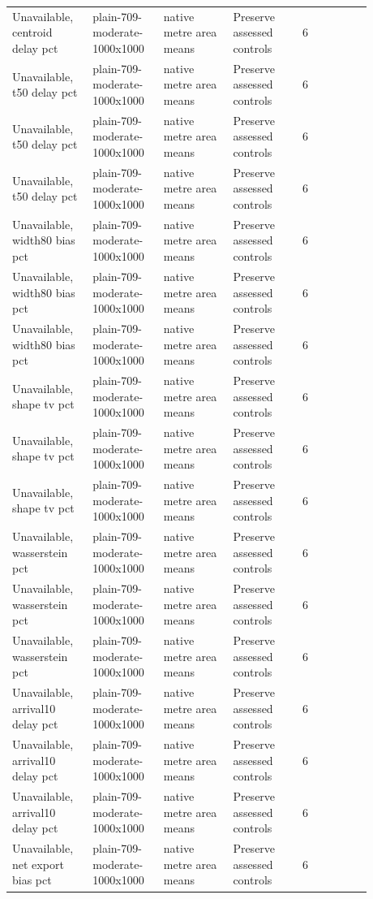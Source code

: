 \begin{longtable}{p{0.1760\linewidth}p{0.1760\linewidth}p{0.1760\linewidth}p{0.1760\linewidth}p{0.1760\linewidth}}
Unavailable, centroid delay pct & plain-709-moderate-1000x1000 & native metre area means & Preserve assessed controls & 6 \\
Unavailable, t50 delay pct & plain-709-moderate-1000x1000 & native metre area means & Preserve assessed controls & 6 \\
Unavailable, t50 delay pct & plain-709-moderate-1000x1000 & native metre area means & Preserve assessed controls & 6 \\
Unavailable, t50 delay pct & plain-709-moderate-1000x1000 & native metre area means & Preserve assessed controls & 6 \\
Unavailable, width80 bias pct & plain-709-moderate-1000x1000 & native metre area means & Preserve assessed controls & 6 \\
Unavailable, width80 bias pct & plain-709-moderate-1000x1000 & native metre area means & Preserve assessed controls & 6 \\
Unavailable, width80 bias pct & plain-709-moderate-1000x1000 & native metre area means & Preserve assessed controls & 6 \\
Unavailable, shape tv pct & plain-709-moderate-1000x1000 & native metre area means & Preserve assessed controls & 6 \\
Unavailable, shape tv pct & plain-709-moderate-1000x1000 & native metre area means & Preserve assessed controls & 6 \\
Unavailable, shape tv pct & plain-709-moderate-1000x1000 & native metre area means & Preserve assessed controls & 6 \\
Unavailable, wasserstein pct & plain-709-moderate-1000x1000 & native metre area means & Preserve assessed controls & 6 \\
Unavailable, wasserstein pct & plain-709-moderate-1000x1000 & native metre area means & Preserve assessed controls & 6 \\
Unavailable, wasserstein pct & plain-709-moderate-1000x1000 & native metre area means & Preserve assessed controls & 6 \\
Unavailable, arrival10 delay pct & plain-709-moderate-1000x1000 & native metre area means & Preserve assessed controls & 6 \\
Unavailable, arrival10 delay pct & plain-709-moderate-1000x1000 & native metre area means & Preserve assessed controls & 6 \\
Unavailable, arrival10 delay pct & plain-709-moderate-1000x1000 & native metre area means & Preserve assessed controls & 6 \\
Unavailable, net export bias pct & plain-709-moderate-1000x1000 & native metre area means & Preserve assessed controls & 6 \\

\end{longtable}
